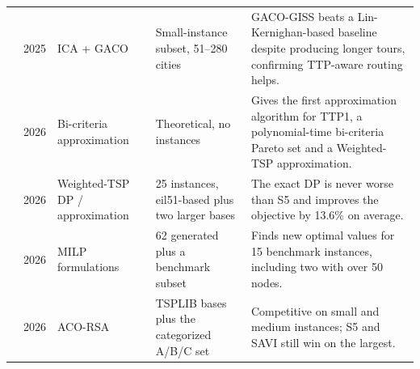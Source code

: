 {\begin{longtable}{@{}p{2.8cm}cp{3.0cm}p{4.9cm}p{7.9cm}@{}}
\citet{zhang2025two} & 2025 & ICA + GACO & Small-instance subset, 51--280 cities & GACO-GISS beats a Lin-Kernighan-based baseline despite producing longer tours, confirming TTP-aware routing helps. \\
\citet{eube2026approximation} & 2026 & Bi-criteria approximation & Theoretical, no instances & Gives the first approximation algorithm for TTP1, a polynomial-time bi-criteria Pareto set and a Weighted-TSP approximation. \\
\citet{eube2026effective} & 2026 & Weighted-TSP DP / approximation & 25 instances, eil51-based plus two larger bases & The exact DP is never worse than S5 and improves the objective by 13.6\% on average. \\
\citet{kapancioglu2026formulations} & 2026 & MILP formulations & 62 generated plus a benchmark subset & Finds new optimal values for 15 benchmark instances, including two with over 50 nodes. \\
\citet{tran2026integrating} & 2026 & ACO-RSA & TSPLIB bases plus the categorized A/B/C set & Competitive on small and medium instances; S5 and SAVI still win on the largest. \\
\end{longtable}
}
